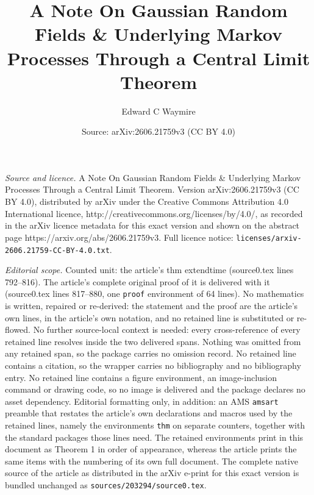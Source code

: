 \documentclass[10pt,a4paper]{amsart}
\title{A Note On Gaussian Random Fields \& Underlying Markov Processes Through a Central Limit Theorem}
\author{Edward C Waymire}
\date{Source: arXiv:2606.21759v3 (CC BY 4.0)}
\begin{document}
\maketitle

\noindent\emph{Source and licence.} A Note On Gaussian Random Fields \& Underlying Markov Processes Through a Central Limit Theorem. Version arXiv:2606.21759v3 (CC BY 4.0), distributed by arXiv under the Creative Commons Attribution 4.0 International licence, http://creativecommons.org/licenses/by/4.0/, as recorded in the arXiv licence metadata for this exact version and shown on the abstract page https://arxiv.org/abs/2606.21759v3. Full licence notice: \texttt{licenses/arxiv-2606.21759-CC-BY-4.0.txt}.\par\smallskip

\noindent\textit{Editorial scope.} Counted unit: the article's thm extendtime (source0.tex lines 792--816). The article's complete original proof of it is delivered with it (source0.tex lines 817--880, one \texttt{proof} environment of 64 lines). No mathematics is written, repaired or re-derived: the statement and the proof are the article's own lines, in the article's own notation, and no retained line is substituted or re-flowed.  No further source-local context is needed: every cross-reference of every retained line resolves inside the two delivered spans.  Nothing was omitted from any retained span, so the package carries no omission record.  No retained line contains a citation, so the wrapper carries no bibliography and no bibliography entry.  No retained line contains a figure environment, an image-inclusion command or drawing code, so no image is delivered and the package declares no asset dependency.  Editorial formatting only, in addition: an AMS \texttt{amsart} preamble that restates the article's own declarations and macros used by the retained lines, namely the environments \texttt{thm} on separate counters, together with the standard packages those lines need.  The retained environments print in this document as Theorem 1 in order of appearance, whereas the article prints the same items with the numbering of its own full document.  The complete native source of the article as distributed in the arXiv e-print for this exact version is bundled unchanged as \texttt{sources/203294/source0.tex}.
\end{document}
